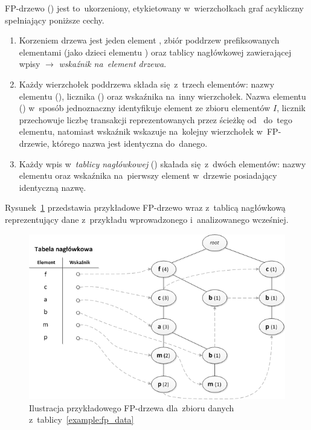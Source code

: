 \begin{df}\label{fptree:def}
FP-drzewo () jest to~ukorzeniony, etykietowany w~wierzchołkach graf acykliczny spełniający poniższe cechy.
\end{df}
\begin{enumerate}
	\item Korzeniem drzewa jest jeden element , zbiór poddrzew prefiksowanych elementami (jako dzieci elementu ) oraz tablicy nagłówkowej zawierającej wpisy  $\rightarrow$ \emph{wskaźnik na~element drzewa}.
	\item Każdy wierzchołek poddrzewa składa się~z~trzech elementów: nazwy elementu (), licznika () oraz wskaźnika na~inny wierzchołek. Nazwa elementu () w~sposób jednoznaczny identyfikuje element ze zbioru elementów $I$, licznik przechowuje liczbę transakcji reprezentowanych przez ścieżkę od~ do~tego elementu, natomiast wskaźnik wskazuje na~kolejny wierzchołek w~FP-drzewie, którego nazwa jest identyczna do~danego.
	\item Każdy wpis w~\emph{tablicy nagłówkowej} () skałada się~z~dwóch elementów: nazwy elementu oraz wskaźnika na~pierwszy element w~drzewie posiadający identyczną nazwę.
\end{enumerate}

Rysunek~\ref{rys:fptree} przedstawia przykładowe FP-drzewo wraz z~tablicą nagłówkową reprezentujący dane z~przykładu wprowadzonego i~analizowanego wcześniej.

\begin{figure}[ht]
\centering\includegraphics{figures/02/fptree.png}
\caption{Ilustracja przykładowego FP-drzewa dla~zbioru danych z~tablicy~\ref{example:fp_data}}\label{rys:fptree}
\end{figure}

